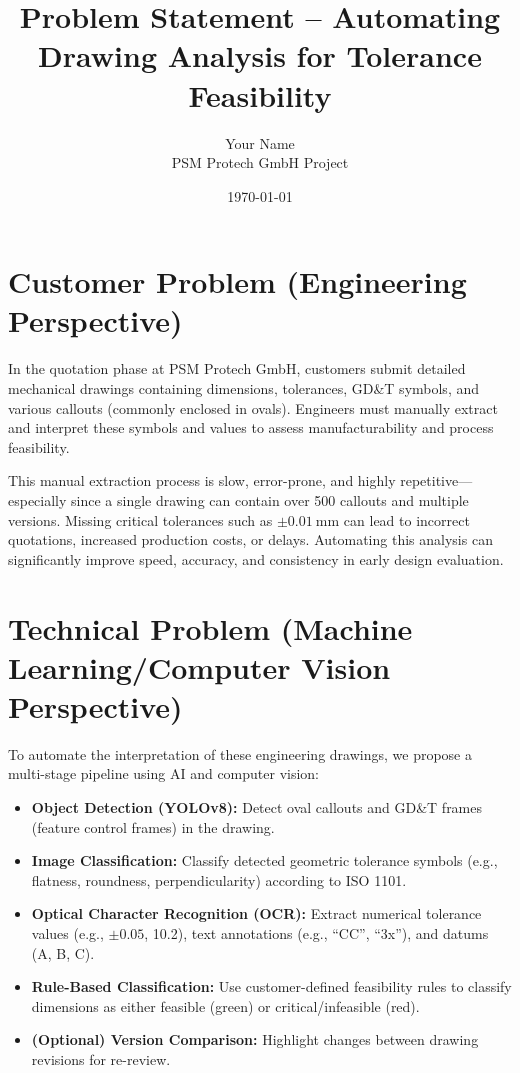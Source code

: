 \documentclass[a4paper,12pt]{article}
\title{\textbf{Problem Statement -- Automating Drawing Analysis for Tolerance Feasibility}}
\author{Your Name \\ PSM Protech GmbH Project}
\date{\today}
\begin{document}
\maketitle

\section*{Customer Problem (Engineering Perspective)}

In the quotation phase at PSM Protech GmbH, customers submit detailed mechanical drawings containing dimensions, tolerances, GD\&T symbols, and various callouts (commonly enclosed in ovals). Engineers must manually extract and interpret these symbols and values to assess manufacturability and process feasibility.

This manual extraction process is slow, error-prone, and highly repetitive---especially since a single drawing can contain over 500 callouts and multiple versions. Missing critical tolerances such as $\pm 0.01~\text{mm}$ can lead to incorrect quotations, increased production costs, or delays. Automating this analysis can significantly improve speed, accuracy, and consistency in early design evaluation.

\section*{Technical Problem (Machine Learning/Computer Vision Perspective)}

To automate the interpretation of these engineering drawings, we propose a multi-stage pipeline using AI and computer vision:

\begin{itemize}
  \item \textbf{Object Detection (YOLOv8):} Detect oval callouts and GD\&T frames (feature control frames) in the drawing.
  \item \textbf{Image Classification:} Classify detected geometric tolerance symbols (e.g., flatness, roundness, perpendicularity) according to ISO 1101.
  \item \textbf{Optical Character Recognition (OCR):} Extract numerical tolerance values (e.g., $\pm 0.05$, 10.2), text annotations (e.g., ``CC'', ``3x''), and datums (A, B, C).
  \item \textbf{Rule-Based Classification:} Use customer-defined feasibility rules to classify dimensions as either feasible (green) or critical/infeasible (red).
  \item \textbf{(Optional) Version Comparison:} Highlight changes between drawing revisions for re-review.
\end{itemize}
\end{document}
